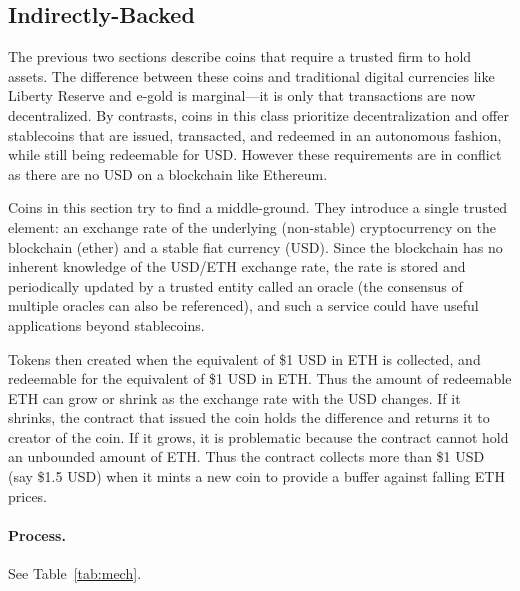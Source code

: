 \subsection{Indirectly-Backed}
\label{sec:dai}

The previous two sections describe coins that require a trusted firm to hold assets. The difference between these coins and traditional digital currencies like Liberty Reserve and e-gold is marginal---it is only that transactions are now decentralized. By contrasts, coins in this class prioritize decentralization and offer stablecoins that are issued, transacted, and redeemed in an autonomous fashion, while still being redeemable for USD. However these requirements are in conflict as there are no USD on a blockchain like Ethereum.

Coins in this section try to find a middle-ground. They introduce a single trusted element: an exchange rate of the underlying (non-stable) cryptocurrency on the blockchain (\eg ether) and a stable fiat currency (\eg USD). Since the blockchain has no inherent knowledge of the USD/ETH exchange rate, the rate is stored and periodically updated by a trusted entity called an oracle (the consensus of multiple oracles can also be referenced), and such a service could have useful applications beyond stablecoins.

Tokens then created when the equivalent of \$1 USD in ETH is collected, and redeemable for the equivalent of \$1 USD in ETH. Thus the amount of redeemable ETH can grow or shrink as the exchange rate with the USD changes. If it shrinks, the contract that issued the coin holds the difference and returns it to creator of the coin. If it grows, it is problematic because the contract cannot hold an unbounded amount of ETH. Thus the contract collects more than \$1 USD (say \$1.5 USD) when it mints a new coin to provide a buffer against falling ETH prices.

\paragraph{Process.} See Table~\ref{tab:mech}.

